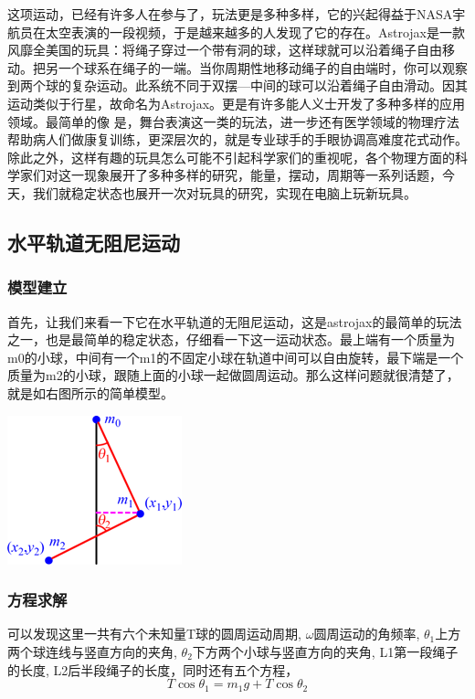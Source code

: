 \documentclass[12pt,a4paper]{ctexart}
\begin{document}
	这项运动，已经有许多人在参与了，玩法更是多种多样，它的兴起得益于NASA宇航员在太空表演的一段视频，于是越来越多的人发现了它的存在。Astrojax是一款风靡全美国的玩具：将绳子穿过一个带有洞的球，这样球就可以沿着绳子自由移动。把另一个球系在绳子的一端。当你周期性地移动绳子的自由端时，你可以观察到两个球的复杂运动。此系统不同于双摆---中间的球可以沿着绳子自由滑动。因其运动类似于行星，故命名为Astrojax。更是有许多能人义士开发了多种多样的应用领域。最简单的像
	是，舞台表演这一类的玩法，进一步还有医学领域的物理疗法帮助病人们做康复训练，更深层次的，就是专业球手的手眼协调高难度花式动作。除此之外，这样有趣的玩具怎么可能不引起科学家们的重视呢，各个物理方面的科学家们对这一现象展开了多种多样的研究，能量，摆动，周期等一系列话题，今天，我们就稳定状态也展开一次对玩具的研究，实现在电脑上玩新玩具。
	\subsection{水平轨道无阻尼运动}
	\subsubsection{模型建立}
	\begin{minipage}[b]{0.65\linewidth}
		首先，让我们来看一下它在水平轨道的无阻尼运动，这是astrojax的最简单的玩法之一，也是最简单的稳定状态，仔细看一下这一运动状态。最上端有一个质量为m0的小球，中间有一个m1的不固定小球在轨道中间可以自由旋转，最下端是一个质量为m2的小球，跟随上面的小球一起做圆周运动。那么这样问题就很清楚了，就是如右图所示的简单模型。
	\end{minipage}
	\hfill
	\begin{minipage}[b]{0.35\linewidth}
		\includegraphics[height=8\baselineskip]{T02.png}
	\end{minipage}
	\subsubsection{方程求解}
	可以发现这里一共有六个未知量T球的圆周运动周期, $\omega$圆周运动的角频率, $\theta_1$上方两个球连线与竖直方向的夹角,  $\theta_2$下方两个小球与竖直方向的夹角, L1第一段绳子的长度, L2后半段绳子的长度，同时还有五个方程，
	$$T\cos{\theta_1}=m_1g+T\cos{\theta_2}$$
	
\end{document}
